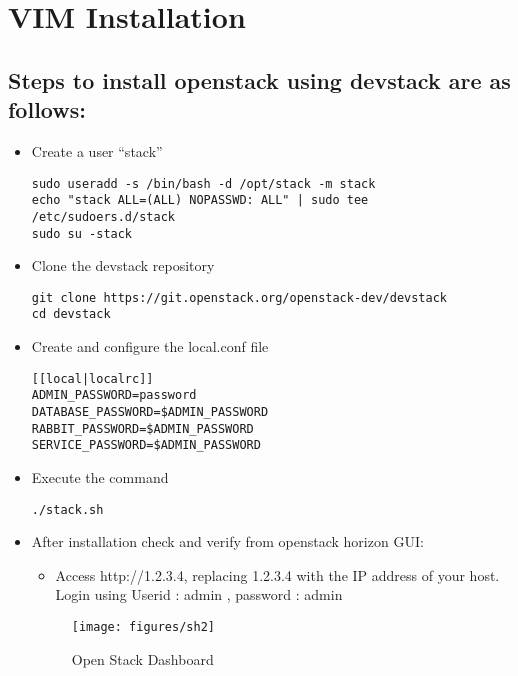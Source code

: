 \section{VIM Installation}

\subsection{Steps to install openstack using devstack are as follows:}

\begin{itemize}
\item Create a user “stack”
\begin{lstlisting}
sudo useradd -s /bin/bash -d /opt/stack -m stack
echo "stack ALL=(ALL) NOPASSWD: ALL" | sudo tee /etc/sudoers.d/stack
sudo su -stack
\end{lstlisting}
\item Clone the devstack repository

\begin{lstlisting}
git clone https://git.openstack.org/openstack-dev/devstack
cd devstack
\end{lstlisting}

\item Create and configure the local.conf file
\begin{lstlisting}
[[local|localrc]]
ADMIN_PASSWORD=password
DATABASE_PASSWORD=$ADMIN_PASSWORD
RABBIT_PASSWORD=$ADMIN_PASSWORD
SERVICE_PASSWORD=$ADMIN_PASSWORD
\end{lstlisting}

\item Execute the command
\begin{lstlisting}
./stack.sh
\end{lstlisting}
\pagebreak
\item After installation check and verify from openstack horizon GUI:
\begin{itemize}
\item Access http://1.2.3.4, replacing 1.2.3.4 with the IP address of your host.
Login using Userid : admin , password : admin
\end{itemize}
\begin{figure} [H]
	\centering
	\texttt{[image: figures/sh2]}
	\caption{Open Stack Dashboard}
\end{figure}
\end{itemize}
